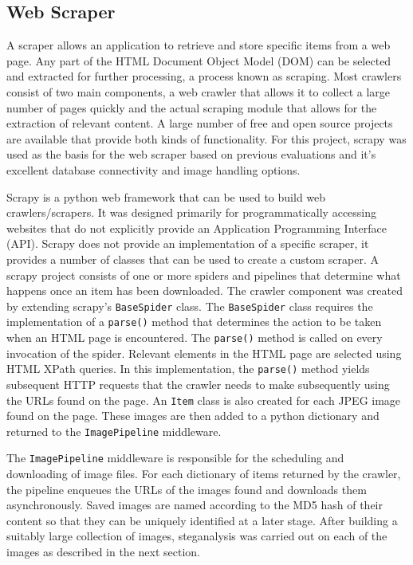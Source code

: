 \subsection {Web Scraper}
\label{sec:scraper}
A scraper allows an application to retrieve and store specific items from a web page. Any part of the HTML Document Object Model (DOM) can be selected and extracted for further processing, a process known as scraping. Most crawlers consist of two main components, a web crawler that allows it to collect a large number of pages quickly and the actual scraping module that allows for the extraction of relevant content. A large number of free and open source projects are available that provide both kinds of functionality. For this project, scrapy was used as the basis for the web scraper based on previous evaluations and it's excellent database connectivity and image handling options.
\par Scrapy is a python web framework that can be used to build web crawlers/scrapers. It was designed primarily for programmatically accessing websites that do not explicitly provide an Application Programming Interface (API). Scrapy does not provide an implementation of a specific scraper, it provides a number of classes that can be used to create a custom scraper. A scrapy project consists of one or more spiders and pipelines that determine what happens once an item has been downloaded. The crawler component was created by extending scrapy's \texttt{BaseSpider} class. The \texttt{BaseSpider} class requires the implementation of a \texttt{parse()} method that determines the action to be taken when an HTML page is encountered. The \texttt{parse()} method is called on every invocation of the spider. Relevant elements in the HTML page are selected using HTML XPath queries. In this implementation, the \texttt{parse()} method yields subsequent HTTP requests that the crawler needs to make subsequently using the URLs found on the page. An \texttt{Item} class is also created for each JPEG image found on the page. These images are then added to a python dictionary and returned to the \texttt{ImagePipeline} middleware.
\par The \texttt{ImagePipeline} middleware is responsible for the scheduling and downloading of image files. For each dictionary of items returned by the crawler, the pipeline enqueues the URLs of the images found and downloads them asynchronously. Saved images are named according to the MD5 hash of their content so that they can be uniquely identified at a later stage. After building a suitably large collection of images, steganalysis was carried out on each of the images as described in the next section.

